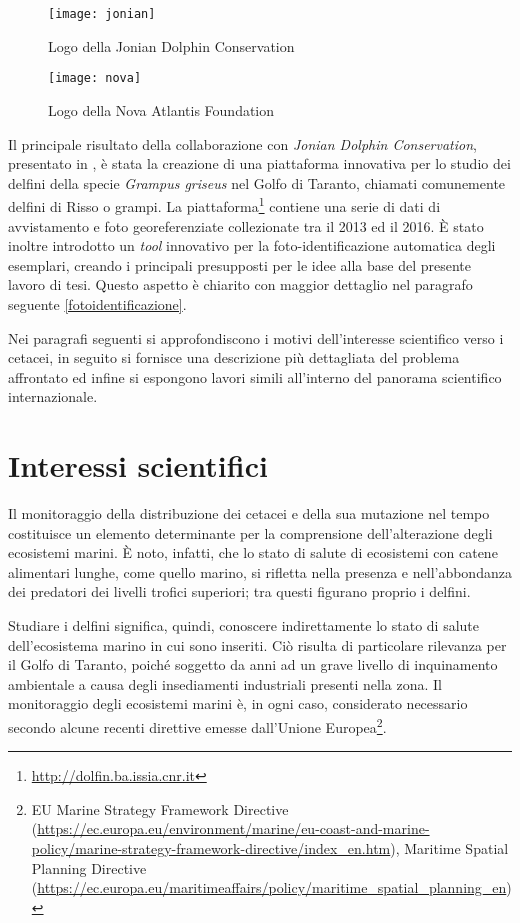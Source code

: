 \begin{figure}[h!]
  \begin{minipage}[b]{0.45\textwidth}
  \centering
    \texttt{[image: jonian]}
    \caption{Logo della Jonian Dolphin Conservation}
    \label{fig:jdc}
  \end{minipage}
  \hfill
  \begin{minipage}[b]{0.45\textwidth}
  \centering
    \texttt{[image: nova]}
    \caption{Logo della Nova Atlantis Foundation}
    \label{fig:naf}
  \end{minipage}
\end{figure}

Il principale risultato della collaborazione con \textit{Jonian Dolphin Conservation}, presentato in \cite{maglietta}, è stata la creazione di una piattaforma innovativa per lo studio dei delfini della specie \textit{Grampus griseus} nel Golfo di Taranto, chiamati comunemente delfini di Risso o grampi. La piattaforma\footnote{\url{http://dolfin.ba.issia.cnr.it}} contiene una serie di dati di avvistamento e foto georeferenziate collezionate tra il 2013 ed il 2016. È stato inoltre introdotto un \textit{tool} innovativo per la foto-identificazione automatica degli esemplari, creando i principali presupposti per le idee alla base del presente lavoro di tesi. Questo aspetto è chiarito con maggior dettaglio nel paragrafo seguente \ref{fotoidentificazione}.

Nei paragrafi seguenti si approfondiscono i motivi dell'interesse scientifico verso i cetacei, in seguito si fornisce una descrizione più dettagliata del problema affrontato ed infine si espongono lavori simili all’interno del panorama scientifico internazionale.


\section{Interessi scientifici}
\label{contesto}
Il monitoraggio della distribuzione dei cetacei e della sua mutazione nel tempo costituisce un elemento determinante per la comprensione dell'alterazione degli ecosistemi marini. È noto, infatti, che lo stato di salute di ecosistemi con catene alimentari lunghe, come quello marino, si rifletta nella presenza e nell'abbondanza dei predatori dei livelli trofici superiori; tra questi figurano proprio i delfini.

Studiare i delfini significa, quindi, conoscere indirettamente lo stato di salute dell'ecosistema marino in cui sono inseriti. Ciò risulta di particolare rilevanza per il Golfo di Taranto, poiché soggetto da anni ad un grave livello di inquinamento ambientale a causa degli insediamenti industriali presenti nella zona. Il monitoraggio degli ecosistemi marini è, in ogni caso, considerato necessario secondo alcune recenti direttive emesse dall'Unione Europea\footnote{EU Marine Strategy Framework Directive (\url{https://ec.europa.eu/environment/marine/eu-coast-and-marine-policy/marine-strategy-framework-directive/index_en.htm}), Maritime Spatial Planning Directive (\url{https://ec.europa.eu/maritimeaffairs/policy/maritime_spatial_planning_en})}.\\

